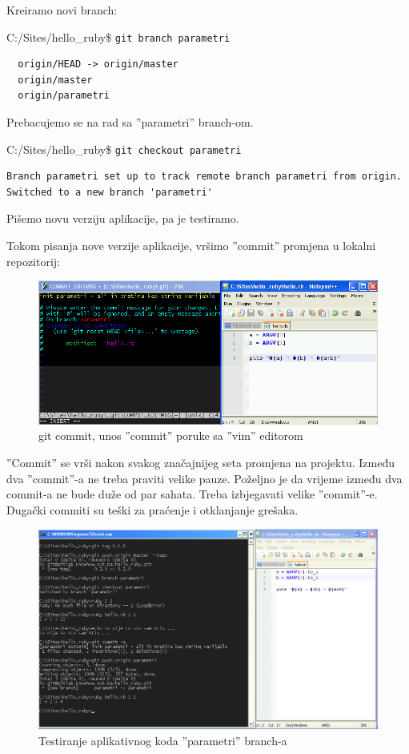 \documentclass[times, utf8, seminar]{fit}
\begin{document}
\setlength{\parindent 0cm}
Kreiramo novi branch:

C:/Sites/hello\_ruby\$ \texttt{git branch parametri}
\begin{lstlisting}
  origin/HEAD -> origin/master
  origin/master
  origin/parametri
\end{lstlisting}

Prebacujemo se na rad sa ''parametri'' branch-om.

C:/Sites/hello\_ruby\$ \texttt{git checkout parametri}
\begin{lstlisting}
Branch parametri set up to track remote branch parametri from origin.
Switched to a new branch 'parametri'
\end{lstlisting}

Pišemo novu verziju aplikacije, pa je testiramo.

Tokom pisanja nove verzije aplikacije, vršimo ''commit'' promjena u lokalni repozitorij:

\begin{figure}[H]
\centering
\includegraphics[width=15cm]{img/gitlab_new_branch_commit_with_vim}
\caption{git commit, unos ''commit'' poruke sa ''vim'' editorom}
\end{figure}

''Commit'' se vrši nakon svakog značajnijeg seta promjena na projektu.  Između dva ''commit''-a ne treba praviti velike pauze. Poželjno je da vrijeme između dva commit-a ne bude duže od par sahata. Treba izbjegavati velike ''commit''-e. Dugački commiti su teški za praćenje i otklanjanje grešaka.

\begin{figure}[H]
\centering
\includegraphics[width=15cm]{img/gitlab_new_branch_3.png}
\caption{Testiranje aplikativnog koda ''parametri'' branch-a}
\end{figure}
\end{document}
